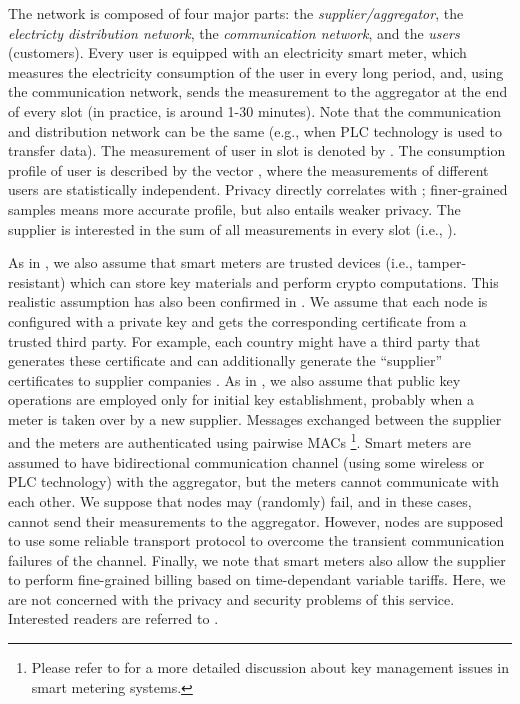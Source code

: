 \documentclass[11pt,a4paper]{article}
\theoremstyle{plain}
\theoremstyle{plain}
\theoremstyle{plain}
\theoremstyle{plain}
\theoremstyle{nonumberplain} \theoremseparator{}
\begin{document}
The network is composed of four major parts: the \emph{supplier/aggregator}, the \emph{electricty distribution network}, the \emph{communication network}, and the \emph{users} (customers). 
Every user is equipped with an electricity smart meter, which measures the electricity consumption of the user in every  long period, and, using the communication network,  
sends the measurement to the aggregator at the end of every slot (in practice,  is around 1-30 minutes). Note that the communication and distribution network can be the same (e.g., when PLC technology is used to transfer data). 
The measurement of user  in slot  is denoted by . The consumption profile of user  is described by the vector , where the measurements of different users
are statistically independent.  
Privacy directly correlates with
; finer-grained samples means more accurate profile, but also entails weaker privacy.
The supplier is interested in the sum of all measurements in every slot (i.e., ). 


As in \cite{bohli10icc}, we also assume that smart meters are trusted devices (i.e., tamper-resistant) which can store key materials and perform crypto computations. This realistic assumption has also been confirmed in \cite{anderson10smartgridcomm}. We assume that each node is configured with a private key and gets the corresponding certificate from a trusted third party. For example, each country might have a third party that generates these certificate and can additionally generate the ``supplier'' certificates to supplier companies \cite{anderson10smartgridcomm}.
As in \cite{anderson10smartgridcomm}, we also assume that public key operations are employed only for initial key establishment, probably when a meter is taken over by a new supplier. Messages exchanged between the supplier and the meters are authenticated using pairwise MACs \footnote{Please refer to \cite{anderson10key} for a more detailed
discussion about key management issues in smart metering systems.}.  Smart meters are assumed to have bidirectional communication channel (using some wireless or PLC technology) with the aggregator, but the meters cannot communicate with each other. 
We suppose that nodes may (randomly) fail, and in these cases, cannot send their measurements to the aggregator. However, nodes are supposed to use some reliable transport protocol to overcome the transient communication failures of the channel. Finally, we note that smart meters also allow the supplier to perform fine-grained billing based on time-dependant variable tariffs. Here, we are not concerned with the privacy and security problems of this service. Interested readers are referred to \cite{danezis10tc,Molina10buildsys}.
 
\end{document}
